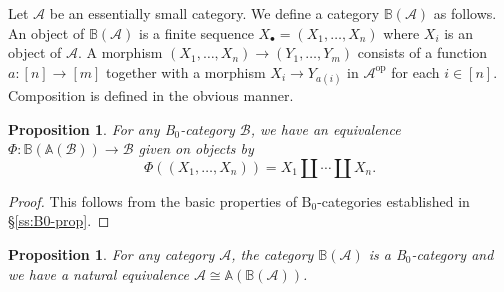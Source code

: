 \documentclass[12pt]{amsart}
\numberwithin{equation}{section}
\newtheorem{proposition}[equation]{Proposition}
\theoremstyle{definition}
\newcommand{\cA}{\mathcal{A}}
\newcommand{\cB}{\mathcal{B}}
\newcommand{\rB}{\mathrm{B}}
\renewcommand{\AA}{\mathbb{A}}
\newcommand{\BB}{\mathbb{B}}
\newcommand{\op}{\mathrm{op}}
\begin{document}
Let $\cA$ be an essentially small category. We define a category $\BB(\cA)$ as follows. An object of $\BB(\cA)$ is a finite sequence $X_{\bullet}=(X_1, \ldots, X_n)$ where $X_i$ is an object of $\cA$. A morphism $(X_1, \ldots, X_n) \to (Y_1, \ldots, Y_m)$ consists of a function $a \colon [n] \to [m]$ together with a morphism $X_i \to Y_{a(i)}$ in $\cA^{\op}$ for each $i \in [n]$. Composition is defined in the obvious manner.

\begin{proposition}
For any B${}_0$-category $\cB$, we have an equivalence $\Phi \colon \BB(\AA(\cB)) \to \cB$ given on objects by
\begin{displaymath}
\Phi((X_1, \ldots, X_n)) = X_1 \amalg \cdots \amalg X_n.
\end{displaymath}
\end{proposition}

\begin{proof}
This follows from the basic properties of $\rB_0$-categories established in \S \ref{ss:B0-prop}.
\end{proof}

\begin{proposition} \label{prop:B0}
For any category $\cA$, the category $\BB(\cA)$ is a B${}_0$-category and we have a natural equivalence $\cA \cong \AA(\BB(\cA))$.
\end{proposition}
\end{document}
